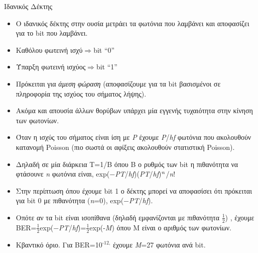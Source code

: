 \documentclass[11pt,aspectratio=169]{beamer}
\begin{document}
\begin{frame}[shrink=20,t]{Ιδανικός Δέκτης}
\begin{itemize}
\item Ο ιδανικός δέκτης στην ουσία μετράει τα φωτόνια που λαμβάνει και αποφασίζει για το bit που λαμβάνει.
\item Καθόλου φωτεινή ισχύ\ensuremath{\Rightarrow}bit “0”
\item Ύπαρξη φωτεινή ισχύος\ensuremath{\Rightarrow}bit “1”
\item Πρόκειται για \textit{άμεση φώραση }(αποφασίζουμε για τα bit βασισμένοι σε πληροφορία της ισχύος του σήματος λήψης).
\item Ακόμα και απουσία άλλων θορύβων υπάρχει μία εγγενής τυχαιότητα στην κίνηση των φωτονίων.
\item Όταν η ισχύς του σήματος είναι ίση με \textit{P} έχουμε \textit{P}/\textit{hf} φωτόνια που ακολουθούν κατανομή Poisson (πιο σωστά οι αφίξεις ακολουθούν στατιστική Poisson).
\item Δηλαδή σε μία διάρκεια Τ=1/B όπου Β ο ρυθμός των bit η πιθανότητα να φτάσουνε \textit{n} φωτόνια είναι, exp(\ensuremath{-}\textit{PT}/\textit{hf})(\textit{PT}/\textit{hf})$^{\text{\textit{n}}}$/\textit{n}!
\item Στην περίπτωση όπου έχουμε bit 1 ο δέκτης μπορεί να αποφασίσει ότι πρόκειται για bit 0 με πιθανότητα (\textit{n}=0), exp(\ensuremath{-}\textit{PT}/\textit{hf}).
\item Οπότε αν τα bit είναι ισοπίθανα (δηλαδή εμφανίζονται με πιθανότητα \ensuremath{\tfrac{1}{2}}) , έχουμε BER=\ensuremath{\tfrac{1}{2}}exp(\ensuremath{-}\textit{PT}/\textit{hf})=\ensuremath{\tfrac{1}{2}}exp(-\textit{M}) όπου Μ είναι ο αριθμός των φωτονίων.
\item Κβαντικό όριο. Για BER=10$^{\text{-12,}}$ έχουμε \textit{M}=27 φωτόνια ανά bit.
\end{itemize}
\end{frame}
\end{document}
